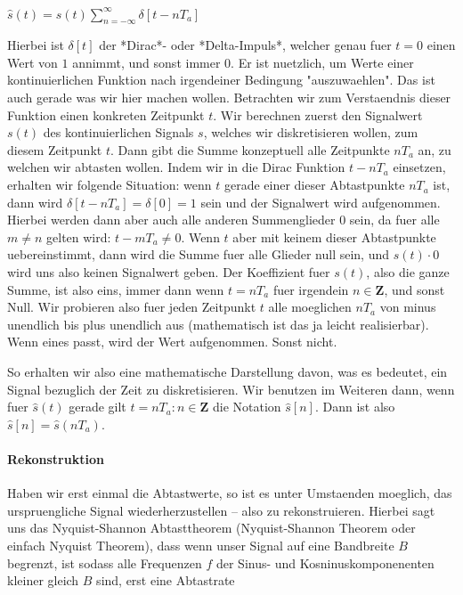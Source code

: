 $\hat{s}(t) = s(t)\sum_{n=-\infty}^\infty \delta[t - nT_a]$

Hierbei ist $\delta[t]$ der *Dirac*- oder *Delta-Impuls*, welcher genau fuer $t
= 0$ einen Wert von $1$ annimmt, und sonst immer $0$. Er ist nuetzlich, um Werte
einer kontinuierlichen Funktion nach irgendeiner Bedingung "auszuwaehlen". Das
ist auch gerade was wir hier machen wollen. Betrachten wir zum Verstaendnis
dieser Funktion einen konkreten Zeitpunkt $t$. Wir berechnen zuerst den
Signalwert $s(t)$ des kontinuierlichen Signals $s$, welches wir diskretisieren
wollen, zum diesem Zeitpunkt $t$. Dann gibt die Summe konzeptuell alle
Zeitpunkte $nT_a$ an, zu welchen wir abtasten wollen. Indem wir in die Dirac
Funktion $t - nT_a$ einsetzen, erhalten wir folgende Situation: wenn $t$ gerade
einer dieser Abtastpunkte $nT_a$ ist, dann wird $\delta[t - nT_a] = \delta[0] =
1$ sein und der Signalwert wird aufgenommen. Hierbei werden dann aber auch alle
anderen Summenglieder $0$ sein, da fuer alle $m \neq n$ gelten wird: $t - mT_a
\neq 0$. Wenn $t$ aber mit keinem dieser Abtastpunkte uebereinstimmt, dann wird
die Summe fuer alle Glieder null sein, und $s(t) \cdot 0$ wird uns also keinen
Signalwert geben. Der Koeffizient fuer $s(t)$, also die ganze Summe, ist also
eins, immer dann wenn $t = nT_a$ fuer irgendein $n \in \mathbf{Z}$, und sonst
Null. Wir probieren also fuer jeden Zeitpunkt $t$ alle moeglichen $nT_a$ von
minus unendlich bis plus unendlich aus (mathematisch ist das ja leicht
realisierbar). Wenn eines passt, wird der Wert aufgenommen. Sonst nicht.

So erhalten wir also eine mathematische Darstellung davon, was es bedeutet, ein
Signal bezuglich der Zeit zu diskretisieren. Wir benutzen im Weiteren dann, wenn
fuer $\hat{s}(t)$ gerade gilt $t = nT_a: n \in \mathbf{Z}$ die Notation
$\hat{s}[n]$. Dann ist also $\hat{s}[n] = \hat{s}(nT_a)$.

\paragraph{ Rekonstruktion}

Haben wir erst einmal die Abtastwerte, so ist es unter Umstaenden moeglich, das
urspruengliche Signal wiederherzustellen -- also zu rekonstruieren. Hierbei sagt
uns das Nyquist-Shannon Abtasttheorem (Nyquist-Shannon Theorem oder einfach
Nyquist Theorem), dass wenn unser Signal auf eine Bandbreite $B$ begrenzt, ist
sodass alle Frequenzen $f$ der Sinus- und Kosninuskomponenenten kleiner gleich
$B$ sind, erst eine Abtastrate

